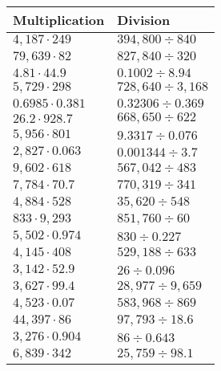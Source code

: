 \begin{longtable}[]{@{}ll@{}}
\toprule
Multiplication & Division\tabularnewline
\midrule
\endhead
\(4,187\cdot249\) & \(394,800÷840\)\tabularnewline
\(79,639\cdot82\) & \(827,840÷320\)\tabularnewline
\(4.81\cdot44.9\) & \(0.1002÷8.94\)\tabularnewline
\(5,729\cdot298\) & \(728,640÷3,168\)\tabularnewline
\(0.6985\cdot0.381\) & \(0.32306÷0.369\)\tabularnewline
\(26.2\cdot928.7\) & \(668,650÷622\)\tabularnewline
\(5,956\cdot801\) & \(9.3317÷0.076\)\tabularnewline
\(2,827\cdot0.063\) & \(0.001344÷3.7\)\tabularnewline
\(9,602\cdot618\) & \(567,042÷483\)\tabularnewline
\(7,784\cdot70.7\) & \(770,319÷341\)\tabularnewline
\(4,884\cdot528\) & \(35,620÷548\)\tabularnewline
\(833\cdot9,293\) & \(851,760÷60\)\tabularnewline
\(5,502\cdot0.974\) & \(830÷0.227\)\tabularnewline
\(4,145\cdot408\) & \(529,188÷633\)\tabularnewline
\(3,142\cdot52.9\) & \(26÷0.096\)\tabularnewline
\(3,627\cdot99.4\) & \(28,977÷9,659\)\tabularnewline
\(4,523\cdot0.07\) & \(583,968÷869\)\tabularnewline
\(44,397\cdot86\) & \(97,793÷18.6\)\tabularnewline
\(3,276\cdot0.904\) & \(86÷0.643\)\tabularnewline
\(6,839\cdot342\) & \(25,759÷98.1\)\tabularnewline
\bottomrule
\end{longtable}
